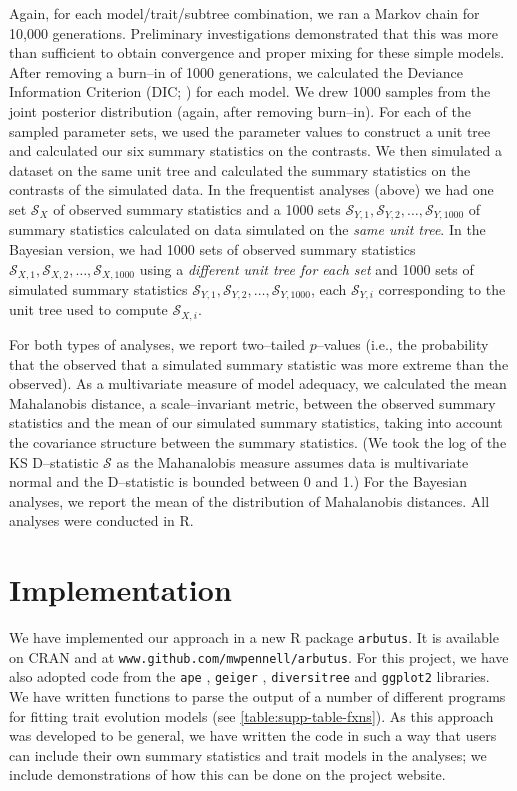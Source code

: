 \documentclass[a4paper,12pt]{article}
\begin{document}
Again, for each model/trait/subtree combination, we ran a Markov chain for 10,000 generations. Preliminary investigations demonstrated that this was more than sufficient to obtain convergence and proper mixing for these simple models. After removing a burn--in of 1000 generations, we calculated the Deviance Information Criterion (DIC; \citep{dic}) for each model. We drew 1000 samples from the joint posterior distribution (again, after removing burn--in). For each of the sampled parameter sets, we used the parameter values to construct a unit tree and calculated our six summary statistics on the contrasts. We then simulated a dataset on the same unit tree and calculated the summary statistics on the contrasts of the simulated data. In the frequentist analyses (above) we had one set $\mathcal{S}_X$ of observed summary statistics and a 1000 sets $\mathcal{S}_{Y,1}, \mathcal{S}_{Y,2}, \ldots, \mathcal{S}_{Y,1000}$ of summary statistics calculated on data simulated on the \emph{same unit tree}. In the Bayesian version, we had 1000 sets of observed summary statistics $\mathcal{S}_{X,1}, \mathcal{S}_{X,2}, \ldots, \mathcal{S}_{X,1000}$ using a \emph{different unit tree for each set} and 1000 sets of simulated summary statistics $\mathcal{S}_{Y,1}, \mathcal{S}_{Y,2}, \ldots, \mathcal{S}_{Y,1000}$, each $\mathcal{S}_{Y,i}$ corresponding to the unit tree used to compute $\mathcal{S}_{X,i}$.
 
For both types of analyses, we report two--tailed $p$--values (i.e., the probability that the observed that a simulated summary statistic was more extreme than the observed). As a multivariate measure of model adequacy, we calculated the mean Mahalanobis distance, a scale--invariant metric, between the observed summary statistics and the mean of our simulated summary statistics, taking into account the covariance structure between the summary statistics. (We took the log of the KS D--statistic $\mathcal{S}$ as the Mahanalobis measure assumes data is multivariate normal and the D--statistic is bounded between 0 and 1.) For the Bayesian analyses, we report the mean of the distribution of Mahalanobis distances. All analyses were conducted in R.

\section{Implementation}

We have implemented our approach in a new R package \texttt{arbutus}. It is available on CRAN and at \texttt{www.github.com/mwpennell/arbutus}. For this project, we have also adopted code from the \texttt{ape} \citep{ape}, \texttt{geiger} \citep{geiger2}, \texttt{diversitree} \citep{FitzJohn2012} and \texttt{ggplot2} \citep{ggplot2} libraries. We have written functions to parse the output of a number of different programs for fitting trait evolution models (see \ref{table:supp-table-fxns}). As this approach was developed to be general, we have written the code in such a way that users can include their own summary statistics and trait models in the analyses; we include demonstrations of how this can be done on the project website.
\end{document}
